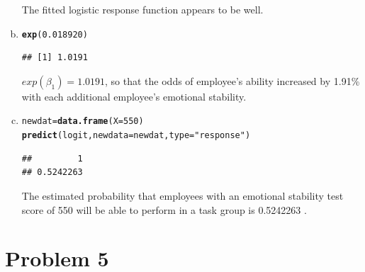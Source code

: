 \documentclass{article}\usepackage[]{graphicx}\usepackage[]{color}
\makeatletter
\newcommand{\hlnum}[1]{\textcolor[rgb]{0.686,0.059,0.569}{#1}}%
\newcommand{\hlstr}[1]{\textcolor[rgb]{0.192,0.494,0.8}{#1}}%
\newcommand{\hlstd}[1]{\textcolor[rgb]{0.345,0.345,0.345}{#1}}%
\newcommand{\hlkwb}[1]{\textcolor[rgb]{0.69,0.353,0.396}{#1}}%
\newcommand{\hlkwc}[1]{\textcolor[rgb]{0.333,0.667,0.333}{#1}}%
\newcommand{\hlkwd}[1]{\textcolor[rgb]{0.737,0.353,0.396}{\textbf{#1}}}%
\newenvironment{kframe}{%
 \def\at@end@of@kframe{}%
 \ifinner\ifhmode%
  \def\at@end@of@kframe{\end{minipage}}%
  \begin{minipage}{\columnwidth}%
 \fi\fi%
 \def\FrameCommand##1{\hskip\@totalleftmargin \hskip-\fboxsep
 \colorbox{shadecolor}{##1}\hskip-\fboxsep
     \hskip-\linewidth \hskip-\@totalleftmargin \hskip\columnwidth}%
 \MakeFramed {\advance\hsize-\width
   \@totalleftmargin\z@ \linewidth\hsize
   \@setminipage}}%
 {\par\unskip\endMakeFramed%
 \at@end@of@kframe}
\newenvironment{knitrout}{}{} %
\makeatother
\begin{document}
\begin{enumerate}[(a)]
\begin{knitrout}
\end{knitrout}

\qquad The fitted logistic response function appears to be well.

\item

\begin{knitrout}
\color{fgcolor}\begin{kframe}
\begin{alltt}
  \hlkwd{exp}\hlstd{(}\hlnum{0.018920}\hlstd{)}
\end{alltt}
\begin{verbatim}
## [1] 1.0191
\end{verbatim}
\end{kframe}
\end{knitrout}

\qquad $exp(\beta_1)=1.0191$, so that the odds of employee's ability increased by 1.91\% with each additional employee's emotional stability.

\item

\begin{knitrout}
\color{fgcolor}\begin{kframe}
\begin{alltt}
  \hlstd{newdat} \hlkwb{=} \hlkwd{data.frame}\hlstd{(}\hlkwc{X} \hlstd{=} \hlnum{550}\hlstd{)}
  \hlkwd{predict}\hlstd{(logit,} \hlkwc{newdata} \hlstd{= newdat,} \hlkwc{type} \hlstd{=} \hlstr{"response"}\hlstd{)}
\end{alltt}
\begin{verbatim}
##         1 
## 0.5242263
\end{verbatim}
\end{kframe}
\end{knitrout}

\qquad The estimated probability that employees with an emotional stability test score of 550 will be able to perform in a task group is 0.5242263 .

\end{enumerate}

\section{Problem 5}
\end{document}

